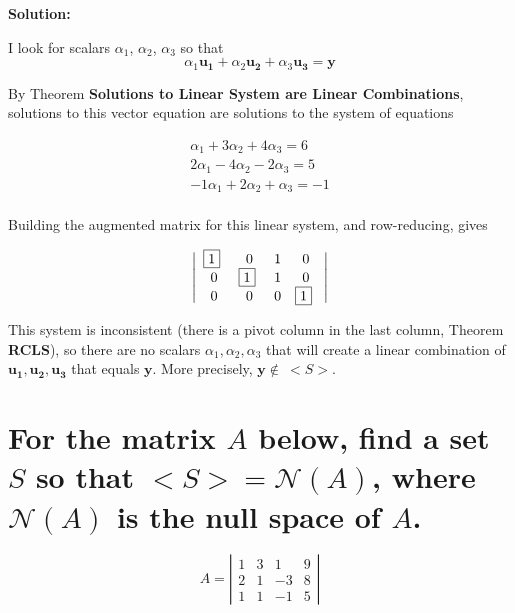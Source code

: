 \documentclass{article}
\begin{document}
\bigskip

\textbf{Solution:}

I look for scalars \(\alpha_1\), \(\alpha_2\), \(\alpha_3\) so that
\begin{equation}
  \alpha_1 \bm{u_1} + \alpha_2 \bm{u_2} + \alpha_3 \bm{u_3} = \bm{y}
\end{equation}

By Theorem \textbf{Solutions to Linear System are Linear Combinations}, solutions to this
vector equation are solutions to the system of equations

\begin{equation}
  \begin{array}{ccc}
    \alpha_1 + 3\alpha_2 + 4\alpha_3 = 6 \\
    2\alpha_1 - 4\alpha_2 - 2\alpha_3 = 5 \\
    -1\alpha_1 + 2\alpha_2 + \alpha_3 = -1 \\
  \end{array}
\end{equation}

Building the augmented matrix for this linear system, and row-reducing, gives

\begin{equation}
 \left| \begin{array}{cccc}
  $\boxed{1}$~ & 0 & 1 & 0 \\
  0 & $\boxed{1}$~ & 1 & 0 \\
  0 & 0 & 0 & $\boxed{1}$~
  \end{array} \right|
\end{equation}

This system is inconsistent (there is a pivot column in the last column, Theorem \textbf{RCLS}), so there are no scalars \(\alpha_1, \alpha_2, \alpha_3\) that will create a linear combination of \(\bm{u_1}, \bm{u_2}, \bm{u_3}\) that equals \(\bm{y}\). More precisely, \(\bm{y} \notin\ <S>\).

\section{For the matrix \(A\) below, find a set \(S\) so that \(<S>=\mathcal{N}(A)\), where \(\mathcal{N}(A)\) is the null space of \(A\).}
\[
A=
 \left| \begin{array}{cccc}
 1 & 3 & 1 & 9 \\
 2 & 1 & -3 & 8 \\
 1 & 1 & -1 & 5
 \end{array} \right|
\]
\end{document}
